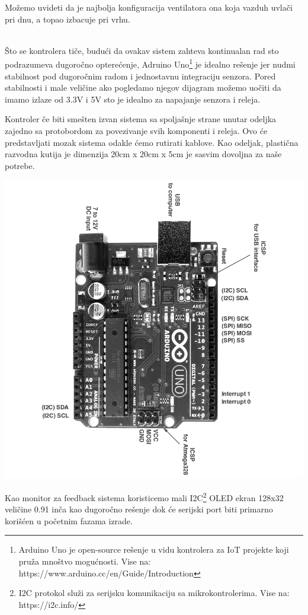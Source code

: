 \documentclass[a4paper,11pt]{book}
\begin{document}
Možemo uvideti da je najbolja konfiguracija ventilatora ona koja vazduh uvlači pri dnu, a topao izbacuje pri vrhu. 


\noindent \\ Što se kontrolera tiče, budući da ovakav sistem zahteva kontinualan rad sto podrazumeva dugoročno opterećenje, Adruino Uno\footnote{Arduino Uno je open-source rešenje u vidu kontrolera za IoT projekte koji pruža mnoštvo mogućnosti. Vise na: https://www.arduino.cc/en/Guide/Introduction} je idealno rešenje jer nudmi stabilnost pod dugoročnim radom i jednostavnu integraciju senzora. Pored stabilnosti i male veličine ako pogledamo njegov dijagram možemo uočiti da imamo izlaze od 3.3V i 5V sto je idealno za napajanje senzora i releja.

Kontroler če biti smešten izvan sistema sa spoljašnje strane unutar odeljka zajedno sa protobordom za povezivanje svih komponenti i releja. Ovo će predstavljati mozak sistema odakle ćemo rutirati kablove. Kao odeljak, plastična razvodna kutija je dimenzija 20cm x 20cm x 5cm je sasvim dovoljna za naše potrebe.

\includegraphics[width=\textwidth]{uno_pinout.png}

Kao monitor za feedback sistema koristicemo mali I2C\footnote{I2C protokol služi za serijsku komunikaciju sa mikrokontrolerima. Vise na: https://i2c.info/} OLED ekran 128x32 veličine 0.91 inča kao dugoročno rešenje dok će serijski port biti primarno korišćen u početnim fazama izrade.
\end{document}

